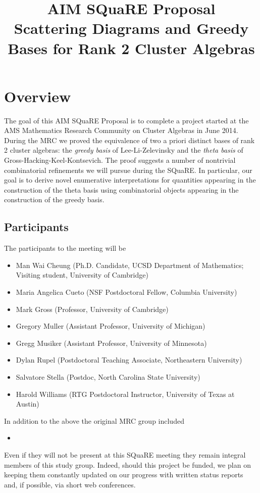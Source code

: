 \documentclass{amsart}
\title[\small{Scattering Diagrams and Greedy Bases for Rank 2 Cluster Algebras}]
  {AIM SQuaRE Proposal\\ 
  \small{Scattering Diagrams and Greedy Bases for Rank 2 Cluster Algebras}}
\begin{document}
  \maketitle
  
  \section*{Overview}
    The goal of this AIM SQuaRE Proposal is to complete a project started at the
    AMS Mathematics Research Community on Cluster Algebras in June 2014.
    During the MRC we proved the equivalence of two a priori distinct bases of
    rank 2 cluster algebras: the \emph{greedy basis} of Lee-Li-Zelevinsky and
    the \emph{theta basis} of Gross-Hacking-Keel-Kontsevich.
    The proof suggests a number of nontrivial combinatorial refinements we will
    pursue during the SQuaRE.
    In particular, our goal is to derive novel enumerative interpretations for
    quantities appearing in the construction of the theta basis using
    combinatorial objects appearing in the construction of the greedy basis.

  \subsection*{Participants}
    The participants to the meeting will be 
    \begin{itemize}
      \item Man Wai Cheung (Ph.D. Candidate, UCSD Department of Mathematics;
          Visiting student, University of Cambridge)
      \item Maria Angelica Cueto (NSF Postdoctoral Fellow, Columbia University)
      \item Mark Gross (Professor, University of Cambridge)
      \item Gregory Muller (Assistant Professor, University of Michigan)
      \item Gregg Musiker (Assistant Professor, University of Minnesota)
      \item Dylan Rupel (Postdoctoral Teaching Associate, Northeastern
          University)
      \item Salvatore Stella (Postdoc, North Carolina State University)
      \item Harold Williams (RTG Postdoctoral Instructor, University of 
          Texas at Austin) 
    \end{itemize}
    In addition to the above the original MRC group included
    \begin{itemize}
      \item
    \end{itemize}
    Even if they will not be present at this SQuaRE meeting they remain integral
    members of this study group. 
    Indeed, should this project be funded, we plan on keeping them constantly
    updated on our progress with written status reports and, if possible, via
    short web conferences.
  
\end{document}
